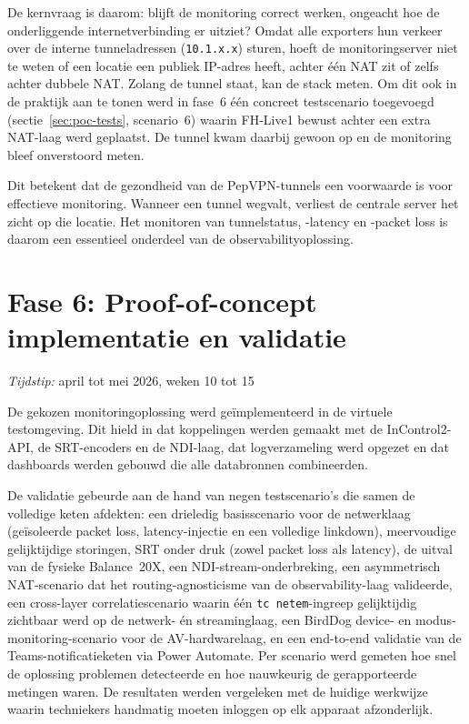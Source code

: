 De kernvraag is daarom: blijft de monitoring correct werken, ongeacht hoe de onderliggende internetverbinding er uitziet? Omdat alle exporters hun verkeer over de interne tunneladressen (\texttt{10.1.x.x}) sturen, hoeft de monitoringserver niet te weten of een locatie een publiek IP-adres heeft, achter één NAT zit of zelfs achter dubbele NAT. Zolang de tunnel staat, kan de stack meten. Om dit ook in de praktijk aan te tonen werd in fase~6 één concreet testscenario toegevoegd (sectie~\ref{sec:poc-tests}, scenario~6) waarin FH-Live1 bewust achter een extra NAT-laag werd geplaatst. De tunnel kwam daarbij gewoon op en de monitoring bleef onverstoord meten.

Dit betekent dat de gezondheid van de PepVPN-tunnels een voorwaarde is voor effectieve monitoring. Wanneer een tunnel wegvalt, verliest de centrale server het zicht op die locatie. Het monitoren van tunnelstatus, -latency en -packet loss is daarom een essentieel onderdeel van de observabilityoplossing.

\section{Fase 6: Proof-of-concept implementatie en validatie}
\label{sec:fase6}

\emph{Tijdstip:} april tot mei 2026, weken 10 tot 15

De gekozen monitoringoplossing werd geïmplementeerd in de virtuele testomgeving. Dit hield in dat koppelingen werden gemaakt met de InControl2-API, de SRT-encoders en de NDI-laag, dat logverzameling werd opgezet en dat dashboards werden gebouwd die alle databronnen combineerden.

De validatie gebeurde aan de hand van negen testscenario's die samen de volledige keten afdekten: een drieledig basisscenario voor de netwerklaag (geïsoleerde packet loss, latency-injectie en een volledige linkdown), meervoudige gelijktijdige storingen, SRT onder druk (zowel packet loss als latency), de uitval van de fysieke Balance~20X, een NDI-stream-onderbreking, een asymmetrisch NAT-scenario dat het routing-agnosticisme van de observability-laag valideerde, een cross-layer correlatiescenario waarin één \texttt{tc~netem}-ingreep gelijktijdig zichtbaar werd op de netwerk- én streaminglaag, een BirdDog device- en modus-monitoring-scenario voor de AV-hardwarelaag, en een end-to-end validatie van de Teams-notificatieketen via Power Automate. Per scenario werd gemeten hoe snel de oplossing problemen detecteerde en hoe nauwkeurig de gerapporteerde metingen waren. De resultaten werden vergeleken met de huidige werkwijze waarin techniekers handmatig moeten inloggen op elk apparaat afzonderlijk.
